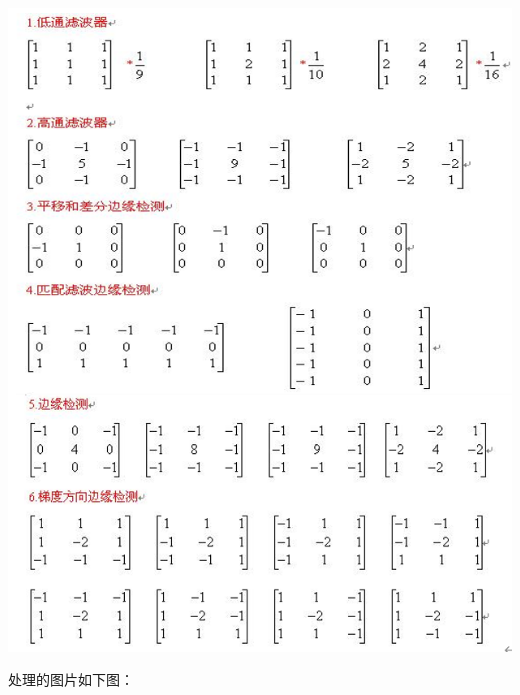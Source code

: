 \documentclass[a4paper,12pt]{article}
\begin{document}
\centering 
\includegraphics[width=0.8\linewidth]{images/Design/image_processing/all_kernels.png}
\justifying

处理的图片如下图：
\end{document}
